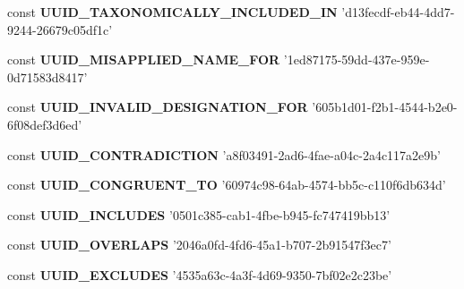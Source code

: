 \begin{DoxyCompactItemize}
\item 
\hypertarget{uuids_8php_ae78e171134dc1ec456db2023787d9120}{const {\bfseries U\-U\-I\-D\-\_\-\-T\-A\-X\-O\-N\-O\-M\-I\-C\-A\-L\-L\-Y\-\_\-\-I\-N\-C\-L\-U\-D\-E\-D\-\_\-\-I\-N} 'd13fecdf-\/eb44-\/4dd7-\/9244-\/26679c05df1c'}\label{uuids_8php_ae78e171134dc1ec456db2023787d9120}

\item 
\hypertarget{uuids_8php_a6dbfd6ebf77d0138da10ebf20aabb030}{const {\bfseries U\-U\-I\-D\-\_\-\-M\-I\-S\-A\-P\-P\-L\-I\-E\-D\-\_\-\-N\-A\-M\-E\-\_\-\-F\-O\-R} '1ed87175-\/59dd-\/437e-\/959e-\/0d71583d8417'}\label{uuids_8php_a6dbfd6ebf77d0138da10ebf20aabb030}

\item 
\hypertarget{uuids_8php_aad993d30d64c8880c7684a967660cab9}{const {\bfseries U\-U\-I\-D\-\_\-\-I\-N\-V\-A\-L\-I\-D\-\_\-\-D\-E\-S\-I\-G\-N\-A\-T\-I\-O\-N\-\_\-\-F\-O\-R} '605b1d01-\/f2b1-\/4544-\/b2e0-\/6f08def3d6ed'}\label{uuids_8php_aad993d30d64c8880c7684a967660cab9}

\item 
\hypertarget{uuids_8php_a01fb1e43021e9ec274dee2419e9ebd76}{const {\bfseries U\-U\-I\-D\-\_\-\-C\-O\-N\-T\-R\-A\-D\-I\-C\-T\-I\-O\-N} 'a8f03491-\/2ad6-\/4fae-\/a04c-\/2a4c117a2e9b'}\label{uuids_8php_a01fb1e43021e9ec274dee2419e9ebd76}

\item 
\hypertarget{uuids_8php_a3f7af8e4ff9ee9fa42292d0fb0fe4a6d}{const {\bfseries U\-U\-I\-D\-\_\-\-C\-O\-N\-G\-R\-U\-E\-N\-T\-\_\-\-T\-O} '60974c98-\/64ab-\/4574-\/bb5c-\/c110f6db634d'}\label{uuids_8php_a3f7af8e4ff9ee9fa42292d0fb0fe4a6d}

\item 
\hypertarget{uuids_8php_ab772cdb55ff262604e5687bfa9cd2568}{const {\bfseries U\-U\-I\-D\-\_\-\-I\-N\-C\-L\-U\-D\-E\-S} '0501c385-\/cab1-\/4fbe-\/b945-\/fc747419bb13'}\label{uuids_8php_ab772cdb55ff262604e5687bfa9cd2568}

\item 
\hypertarget{uuids_8php_ab97f50d73bf087ba30617e3f68c3aaeb}{const {\bfseries U\-U\-I\-D\-\_\-\-O\-V\-E\-R\-L\-A\-P\-S} '2046a0fd-\/4fd6-\/45a1-\/b707-\/2b91547f3ec7'}\label{uuids_8php_ab97f50d73bf087ba30617e3f68c3aaeb}

\item 
\hypertarget{uuids_8php_a342d4e7869ed2da8ec9203f8e4530cd3}{const {\bfseries U\-U\-I\-D\-\_\-\-E\-X\-C\-L\-U\-D\-E\-S} '4535a63c-\/4a3f-\/4d69-\/9350-\/7bf02e2c23be'}\label{uuids_8php_a342d4e7869ed2da8ec9203f8e4530cd3}


\end{DoxyCompactItemize}
